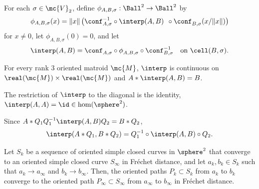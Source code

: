 For each $\sigma \in \mc{V}_{2}$, define
$ \phi_{A,B,\sigma} : \Ball^2 \to \Ball^2 $ by\vspace*{-3pt}
\[ \phi_{A,B,\sigma}(x) = \|x\| \left(\conf_{A,\sigma}^{-1} \circ \interp(A,B)^{\phantom1} \circ \conf_{B,\sigma}^{\phantom1}(x/\|x\|) \right) \]
for $x \neq 0$, let $\phi_{A,B,\sigma}(0)=0$,
and let\vspace*{-3pt}
\[ \interp(A,B) = \conf_{A,\sigma}^{\phantom1} \circ \phi_{A,B,\sigma}^{\phantom1} \circ \conf_{B,\sigma}^{-1} \quad
\text{on } \cell(B,\sigma).\]

\begin{lemma}\label{lemma-interp}
For every rank $3$ oriented matroid $\mc{M}$, $\interp$ is continuous on \hbox{$\real(\mc{M}) \times \real(\mc{M})$} and $A* \interp(A,B) = B$.
\end{lemma}

\begin{observation}\label{observation-interp-id}
The restriction of $\interp$ to the diagonal is the identity, \ie $\interp(A,A) = \id \in \hom(\sphere^2)$.
\end{observation}

\begin{observation}\label{observation-orthinterp}
Since $A*Q_1Q_1^{-1} \interp(A,B) Q_2 = B*Q_2 $,\vspace*{-3pt}
\[ \interp(A*Q_1,B*Q_2) = Q_1^{-1} \circ \interp(A,B) \circ Q_2. \]
\end{observation}

\begin{lemma}\label{lemma-path}
Let $S_k$ be a sequence of oriented simple closed curves in $\sphere^2$ that converge to an oriented simple closed curve $S_\infty$ in Fréchet distance, and let $a_k,b_k \in S_k$ such that $a_k \to a_\infty$ and $b_k \to b_\infty$. Then, the oriented paths $P_k \subset S_k$ from $a_k$ to $b_k$ converge to the oriented path $P_\infty \subset S_\infty$ from $a_\infty$ to $b_\infty$ in Fréchet distance.
\end{lemma}

